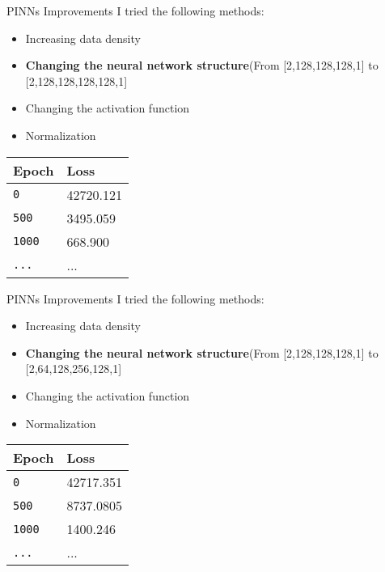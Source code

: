 \documentclass{beamer}
\begin{document}
\begin{frame}{PINNs Improvements}
I tried the following methods: 
\begin{itemize}
    \item Increasing data density 
    \item \textbf{Changing the neural network structure}(From [2,128,128,128,1] to [2,128,128,128,128,1]
    \item Changing the activation function
    \item Normalization
\end{itemize}
\begin{table}[!htbp]
    \centering
    \begin{tabular}{l  | l}
    \hline
        Epoch & Loss \\
        \hline
        \texttt{0}  & 42720.121 \\
        \texttt{500} & 3495.059  \\
        \texttt{1000}  & 668.900 \\
        \texttt{...}& ... \\
        \hline
    \end{tabular}
    \label{doc}
\end{table}
\end{frame}


\begin{frame}{PINNs Improvements}
I tried the following methods: 
\begin{itemize}
    \item Increasing data density 
    \item \textbf{Changing the neural network structure}(From [2,128,128,128,1] to [2,64,128,256,128,1]
    \item Changing the activation function
    \item Normalization
\end{itemize}
\begin{table}[!htbp]
    \centering
    \begin{tabular}{l  | l}
    \hline
        Epoch & Loss \\
        \hline
        \texttt{0}  & 42717.351 \\
        \texttt{500} & 8737.0805  \\
        \texttt{1000}  & 1400.246 \\
        \texttt{...}& ... \\
        \hline
    \end{tabular}
    \label{doc}
\end{table}
\end{frame}
\end{document}
